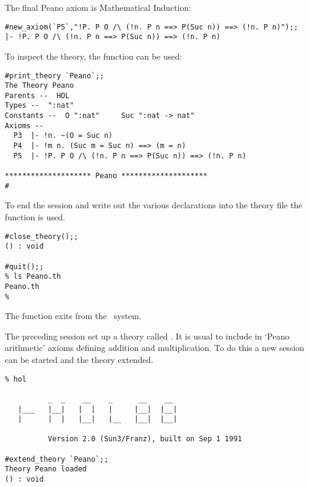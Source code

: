 The final Peano axiom is Mathematical Induction:

\begin{session}\begin{verbatim}
#new_axiom(`P5`,"!P. P O /\ (!n. P n ==> P(Suc n)) ==> (!n. P n)");;
|- !P. P O /\ (!n. P n ==> P(Suc n)) ==> (!n. P n)
\end{verbatim}\end{session}

To inspect the theory, the function  can be used:

\begin{session}\begin{verbatim}
#print_theory `Peano`;;
The Theory Peano
Parents --  HOL
Types --  ":nat"
Constants --  O ":nat"     Suc ":nat -> nat"
Axioms --
  P3  |- !n. ~(O = Suc n)
  P4  |- !m n. (Suc m = Suc n) ==> (m = n)
  P5  |- !P. P O /\ (!n. P n ==> P(Suc n)) ==> (!n. P n)

******************** Peano ********************
#\end{verbatim}\end{session}

To end the session and write out the various declarations into the theory file
 the function  is used.

\begin{session}\begin{verbatim}
#close_theory();;
() : void

#quit();;
% ls Peano.th
Peano.th
%
\end{verbatim}\end{session}

\noindent The function  exits from the \HOL\ system.

The preceding session set up a theory called . It is usual
to include in `Peano arithmetic' axioms defining addition and multiplication.
To do this a new session can be started and the theory extended.

\begin{session}\begin{verbatim}
% hol

          _  _    __    _      __    __
   |___   |__|   |  |   |     |__|  |__|
   |      |  |   |__|   |__   |__|  |__|

          Version 2.0 (Sun3/Franz), built on Sep 1 1991

#extend_theory `Peano`;;
Theory Peano loaded
() : void
\end{verbatim}\end{session}

